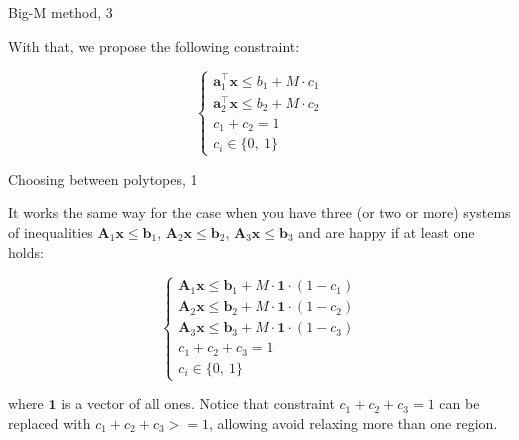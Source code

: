 \documentclass{beamer}
\begin{document}
\begin{frame}{Big-M method, 3}
	\begin{flushleft}
		
		With that, we propose the following constraint:
		
		\begin{equation}
			\begin{cases}
				\mathbf{a}_1^\top \mathbf{x} \leq b_1 + M \cdot c_1 \\
				\mathbf{a}_2^\top \mathbf{x} \leq b_2 + M \cdot c_2 \\
				c_1 + c_2 = 1  \\
				c_i  \in \{0, \ 1 \}
			\end{cases}
		\end{equation}
		
		
		\begin{figure} [h!]
			\begin{center}
				
			\end{center} 
		\end{figure}
		
	\end{flushleft}
\end{frame}




\begin{frame}{Choosing between polytopes, 1}
\begin{flushleft}

It works the same way for the case when you have three (or two or more) systems of inequalities $\mathbf{A}_1 \mathbf{x} \leq \mathbf{b}_1$, $\mathbf{A}_2 \mathbf{x} \leq \mathbf{b}_2$, $\mathbf{A}_3 \mathbf{x} \leq \mathbf{b}_3$ and are happy if at least one holds:

\begin{equation}
    \begin{cases}
    \mathbf{A}_1 \mathbf{x} \leq \mathbf{b}_1 + M \cdot \mathbf{1} \cdot (1 - c_1) \\
    \mathbf{A}_2 \mathbf{x} \leq \mathbf{b}_2 + M \cdot \mathbf{1} \cdot (1 - c_2) \\
    \mathbf{A}_3 \mathbf{x} \leq \mathbf{b}_3 + M \cdot \mathbf{1} \cdot (1 - c_3) \\
    c_1 + c_2 + c_3 = 1 \\
    c_i  \in \{0, \ 1 \}
    \end{cases}
\end{equation}

where $\mathbf{1}$ is a vector of all ones. Notice that constraint $c_1 + c_2 + c_3 = 1$ can be replaced with $c_1 + c_2 + c_3 >= 1$, allowing avoid relaxing more than one region.

\end{flushleft}
\end{frame}
\end{document}
